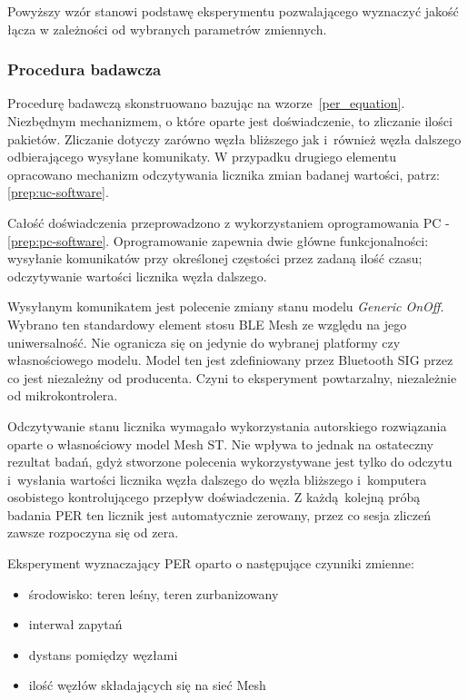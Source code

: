 Powyższy wzór stanowi podstawę eksperymentu pozwalającego wyznaczyć jakość łącza w zależności od
wybranych parametrów zmiennych.

\subsubsection{Procedura badawcza}\label{subsubsec:test-procedure}

Procedurę badawczą skonstruowano bazując na wzorze~\ref{per_equation}. Niezbędnym mechanizmem, o które oparte
jest doświadczenie, to zliczanie ilości pakietów. Zliczanie dotyczy zarówno węzła bliższego 
jak i~również węzła dalszego odbierającego wysyłane komunikaty. W przypadku drugiego elementu 
opracowano mechanizm odczytywania licznika zmian badanej wartości, patrz: \ref{prep:uc-software}.

Całość doświadczenia przeprowadzono z wykorzystaniem oprogramowania PC - \ref{prep:pc-software}. Oprogramowanie
zapewnia dwie główne funkcjonalności: wysyłanie komunikatów przy określonej częstości przez zadaną ilość czasu;
odczytywanie wartości licznika węzła dalszego.

Wysyłanym komunikatem jest polecenie zmiany stanu modelu
\textit{Generic OnOff}. Wybrano ten standardowy element stosu BLE Mesh ze względu na jego uniwersalność.
Nie ogranicza się on jedynie do wybranej platformy czy własnościowego modelu. Model ten jest zdefiniowany
przez Bluetooth SIG przez co jest niezależny od producenta. Czyni to eksperyment powtarzalny,
niezależnie od mikrokontrolera.

Odczytywanie stanu licznika wymagało wykorzystania autorskiego rozwiązania oparte o własnościowy model Mesh
ST. Nie wpływa to jednak na ostateczny rezultat badań, gdyż stworzone polecenia wykorzystywane jest
tylko do odczytu i~wysłania wartości licznika węzła dalszego do węzła bliższego i~komputera osobistego kontrolującego
przepływ doświadczenia. Z każdą kolejną próbą badania PER ten licznik jest automatycznie zerowany,
przez co sesja zliczeń zawsze rozpoczyna się od zera.

Eksperyment wyznaczający PER oparto o następujące czynniki zmienne:
\begin{itemize}
\item środowisko: teren leśny, teren zurbanizowany
\item interwał zapytań
\item dystans pomiędzy węzłami
\item ilość węzłów składających się na sieć Mesh
\end{itemize}


